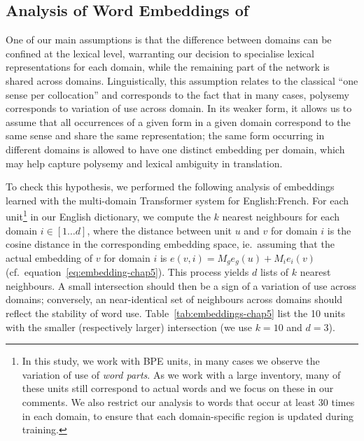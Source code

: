 \subsection{Analysis of Word Embeddings of  \label{ssec:word_embeddings-chap5}}
One of our main assumptions is that the difference between domains can be confined at the lexical level, warranting our decision to specialise lexical representations for each domain, while the remaining part of the network is shared across domains. Linguistically, this assumption relates to the classical ``one sense per collocation'' \citep{Yarowsky93onesense} and corresponds to the fact that in many cases, polysemy corresponds to variation of use across domain. In its weaker form, it allows us to assume that all occurrences of a given form in a given domain correspond to the same sense and share the same representation; the same form occurring in different domains is allowed to have one distinct embedding per domain, which may help capture polysemy and lexical ambiguity in translation. 

To check this hypothesis, we performed the following analysis of embeddings learned with the multi-domain Transformer system for English:French. For each unit\footnote{In this study, we work with BPE units, in many cases we observe the variation of use of \emph{word parts}. As we work with a large inventory, many of these units still correspond to actual words and we focus on these in our comments. We also restrict our analysis to words that occur at least 30 times in each domain, to ensure that each domain-specific region is updated during training.} in our English dictionary, we compute the $k$ nearest neighbours for each domain $i \in [1\dots{}d]$, where the distance between unit $u$ and $v$ for domain $i$ is the cosine distance in the corresponding embedding space, ie.\ assuming that the actual embedding of $v$ for domain $i$ is $e(v,i) = M_ge_g(u) + M_ie_i(v)$ (cf.\ equation~\eqref{eq:embedding-chap5}). This process yields $d$ lists of $k$ nearest neighbours. A small intersection should then be a sign of a variation of use across domains; conversely, an near-identical set of neighbours across domains should reflect the stability of word use. Table~\ref{tab:embeddings-chap5} list the 10 units with the smaller (respectively larger) intersection (we use $k=10$ and $d=3$). 

